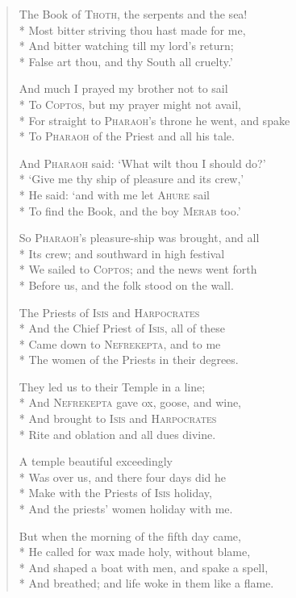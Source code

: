 \documentclass[12pt]{article}
\newcommand{\vin}{\hspace{1em}}
\begin{document}
\begin{verse}
The Book of \textsc{Thoth}, the serpents and the sea!\\*
Most bitter striving thou hast made for me,\\*
\vin And bitter watching till my lord's return;\\*
False art thou, and thy South all cruelty.'

And much I prayed my brother not to sail\\*
To \textsc{Coptos}, but my prayer might not avail,\\*
\vin For straight to \textsc{Pharaoh}'s throne he went, and spake\\*
To \textsc{Pharaoh} of the Priest and all his tale.

And \textsc{Pharaoh} said: `What wilt thou I should do?'\\*
`Give me thy ship of pleasure and its crew,'\\*
\vin He said: `and with me let \textsc{Ahure} sail\\*
To find the Book, and the boy \textsc{Merab} too.'

So \textsc{Pharaoh}'s pleasure-ship was brought, and all\\*
Its crew; and southward in high festival\\*
\vin We sailed to \textsc{Coptos}; and the news went forth\\*
Before us, and the folk stood on the wall.

The Priests of \textsc{Isis} and \textsc{Harpocrates}\\*
And the Chief Priest of \textsc{Isis}, all of these\\*
\vin Came down to \textsc{Nefrekepta}, and to me\\*
The women of the Priests in their degrees.

They led us to their Temple in a line;\\*
And \textsc{Nefrekepta} gave ox, goose, and wine,\\*
\vin And brought to \textsc{Isis} and \textsc{Harpocrates}\\*
Rite and oblation and all dues divine.

A temple beautiful exceedingly\\*
Was over us, and there four days did he\\*
\vin Make with the Priests of \textsc{Isis} holiday,\\*
And the priests' women holiday with me.

But when the morning of the fifth day came,\\*
He called for wax made holy, without blame,\\*
\vin And shaped a boat with men, and spake a spell,\\*
And breathed; and life woke in them like a flame.


\end{verse}
\end{document}
